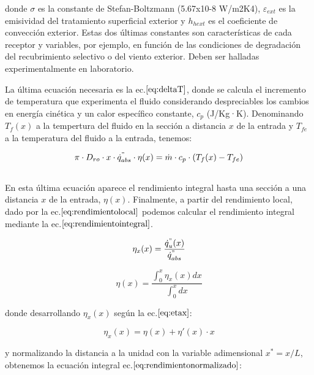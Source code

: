 \documentclass[11pt]{article}
\begin{document}
donde \(\sigma\) es la constante de Stefan-Boltzmann (5.67x10-8 W/m2K4),
\(\varepsilon_{ext}\) es la emisividad del tratamiento superficial
exterior y \(h_{hext}\) es el coeficiente de convección exterior. Estas
dos últimas constantes son características de cada receptor y variables,
por ejemplo, en función de las condiciones de degradación del
recubrimiento selectivo o del viento exterior. Deben ser halladas
experimentalmente en laboratorio.

La última ecuación necesaria es la ec.\(\eqref{eq:deltaT}\), donde se
calcula el incremento de temperatura que experimenta el fluido
considerando despreciables los cambios en energía cinética y un calor
específico constante, \(c_{p}\) (J/Kg·K). Denominando \(T_{f}(x)\) a la
tempertura del fluido en la sección a distancia \(x\) de la entrada y
\(T_{fe}\) a la temperatura del fluido a la entrada, tenemos:

\begin{equation}
    \pi \cdot D_{ro} \cdot x \cdot \dot{q}^{"}_{abs} \cdot \eta(x)= \dot{m} \cdot c_{p} \cdot (T_{f}(x)-T_{fe}) \label{eq:deltaT}
\end{equation}\\

En esta última ecuación aparece el rendimiento integral hasta una
sección a una distancia \(x\) de la entrada, \(\eta(x)\). Finalmente, a
partir del rendimiento local, dado por la
ec.\(\eqref{eq:rendimientolocal}\) podemos calcular el rendimiento
integral mediante la ec.\(\eqref{eq:rendimientointegral}\).

\begin{equation}
    \eta_{x}(x) = \frac{\dot{q}^{"}_{u}(x)}{\dot{q}^{"}_{abs}} \label{eq:rendimientolocal}
\end{equation}

\begin{equation}
    \eta(x) = \frac{\int_{0}^{x}\eta_{x}(x)dx}{\int_{0}^{x}dx} \label{eq:rendimientointegral}
\end{equation}

donde desarrollando \(\eta_{x}(x)\) según la ec.\(\eqref{eq:etax}\):

\begin{equation}
    \eta_{x}(x) = \eta(x) + \eta'(x)\cdot x  \label{eq:etax}
\end{equation}

y normalizando la distancia a la unidad con la variable adimensional
\(x^{*}=x/L\), obtenemos la ecuación integral
ec.\(\eqref{eq:rendimientonormalizado}\):
\end{document}
